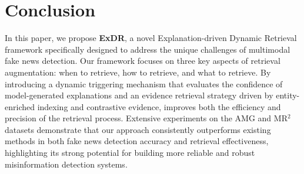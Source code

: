 \section{Conclusion}
In this paper, we propose \textbf{ExDR}, a novel Explanation-driven Dynamic Retrieval framework specifically designed to address the unique challenges of multimodal fake news detection. Our framework focuses on three key aspects of retrieval augmentation: when to retrieve, how to retrieve, and what to retrieve. By introducing a dynamic triggering mechanism that evaluates the confidence of model-generated explanations and an evidence retrieval strategy driven by entity-enriched indexing and contrastive evidence,  improves both the efficiency and precision of the retrieval process. Extensive experiments on the AMG and MR$^2$ datasets demonstrate that our approach consistently outperforms existing methods in both fake news detection accuracy and retrieval effectiveness, highlighting its strong potential for building more reliable and robust misinformation detection systems.
